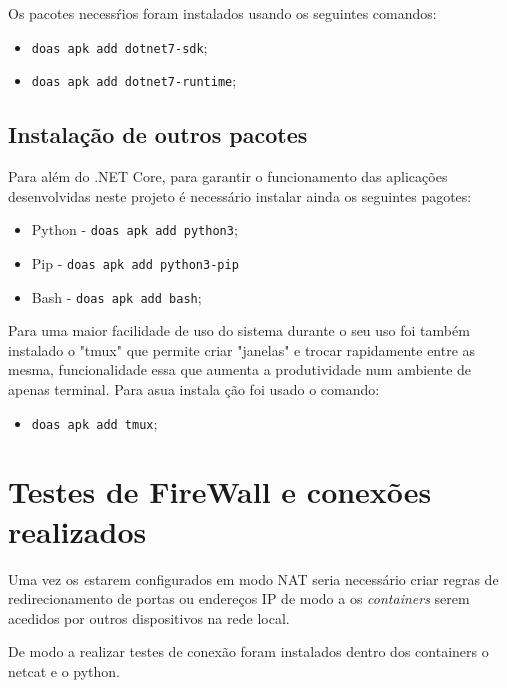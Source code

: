 Os pacotes necessŕios foram instalados usando os seguintes comandos:
\begin{itemize}
    \item \texttt{doas apk add dotnet7-sdk};
    \item \texttt{doas apk add dotnet7-runtime};
\end{itemize}




\subsection{Instalação de outros pacotes}

Para além do .NET Core, para garantir o funcionamento das aplicações desenvolvidas neste projeto é necessário
instalar ainda os seguintes pagotes:
\begin{itemize}
    \item Python - \texttt{doas apk add python3};
    \item Pip - \texttt{doas apk add python3-pip}
    \item Bash - \texttt{doas apk add bash};
\end{itemize}


Para uma maior facilidade de uso do sistema durante o seu uso foi também instalado
o "tmux" que permite criar "janelas" e trocar rapidamente entre as mesma, funcionalidade
essa que aumenta a produtividade num ambiente de apenas terminal.
Para asua instala ção foi usado o comando:
\begin{itemize}
    \item \texttt{doas apk add tmux};
\end{itemize}









\section{Testes de FireWall e conexões realizados}

Uma vez os \textit estarem configurados em modo NAT seria necessário criar regras 
de redirecionamento de portas ou endereços IP de modo a os \textit{containers} serem acedidos
por outros dispositivos na rede local.


De modo a realizar testes de conexão foram instalados dentro dos containers
o netcat e o python.

